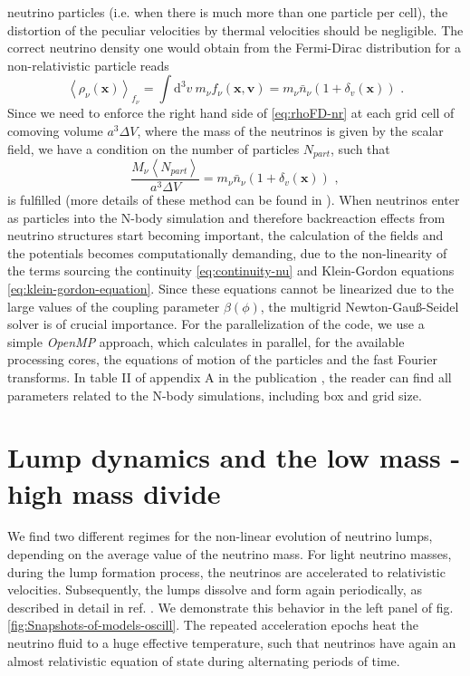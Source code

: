 neutrino particles (i.e. when there is much more than one particle
per cell), the distortion of the peculiar velocities by thermal velocities
should be negligible. The correct neutrino density one would obtain
from the Fermi-Dirac distribution for a non-relativistic particle
reads 
\begin{equation}
\left\langle \rho_{\nu}(\mathbf{x})\right\rangle _{f_{\nu}}=\int\mbox{d}^{3}v\: m_{\nu}f_{\nu}(\mathbf{x},\mathbf{v})=m_{\nu}\bar{n}_{\nu}(1+\delta_{v}(\mathbf{x}))\,\,.\label{eq:rhoFD-nr}
\end{equation}
Since we need to enforce the right hand side of \ref{eq:rhoFD-nr}
at each grid cell of comoving volume $a^{3}\Delta V$, where the mass
of the neutrinos is given by the scalar field, we have a condition
on the number of particles $N_{part}$, such that 
\begin{equation}
\frac{M_{\nu}\left\langle N_{part}\right\rangle }{a^{3}\Delta V}=m_{\nu}\bar{n}_{\nu}(1+\delta_{v}(\mathbf{x}))\,\,,
\end{equation}
is fulfilled (more details of these method can be found in \cite{ayaita_structure_2012}).
When neutrinos enter as particles into the N-body simulation and therefore
backreaction effects from neutrino structures start becoming important,
the calculation of the fields and the potentials becomes computationally
demanding, due to the non-linearity of the terms sourcing the continuity
\ref{eq:continuity-nu} and Klein-Gordon equations \ref{eq:klein-gordon-equation}.
Since these equations cannot be linearized due to the large values
of the coupling parameter $\beta(\phi)$, the multigrid Newton-Gauß-Seidel
solver is of crucial importance. For the parallelization of the code,
we use a simple \emph{OpenMP} approach, which calculates in parallel,
for the available processing cores, the equations of motion of the
particles and the fast Fourier transforms. 
In table II of appendix A in the publication \cite{casas_dynamics_2016},
the reader can find all parameters related to the N-body simulations, including
box and grid size.


\section{Lump dynamics and the low mass - high mass divide \label{sec:GNQ-lumps}}

We find two different regimes for the non-linear evolution of neutrino
lumps, depending on the average value of the neutrino mass. For light
neutrino masses, during the lump formation process, the neutrinos
are accelerated to relativistic velocities. Subsequently, the lumps
dissolve and form again periodically, as described in detail in ref.
\cite{ayaita_nonlinear_2016,baldi_oscillating_2011}. We demonstrate
this behavior in the left panel of fig. \ref{fig:Snapshots-of-models-oscill}.
The repeated acceleration epochs heat the neutrino fluid to a huge
effective temperature, such that neutrinos have again an almost relativistic
equation of state during alternating periods of time.

